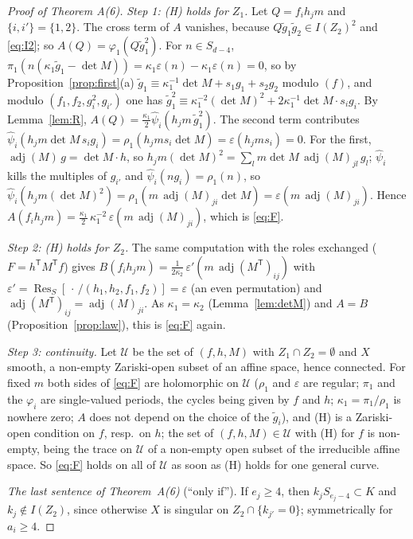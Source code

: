 \documentclass[11pt]{article}
\numberwithin{equation}{section}
\theoremstyle{remark}
\newcommand{\Res}{\operatorname{Res}}
\newcommand{\adj}{\operatorname{adj}}
\newcommand{\gt}{\tilde g}
\begin{document}
\begin{proof}[Proof of Theorem A(6)]
\emph{Step 1: \textup{(H)} holds for $Z_1$.} Let $Q=f_ih_jm$ and $\{i,i'\}=\{1,2\}$. The cross term of $A$
vanishes, because $Q\gt_1\gt_2\in I(Z_2)^2$ and \eqref{eq:I2}; so $A(Q)=\varphi_1(Q\gt_1^2)$. For $n\in S_{d-4}$,
$\pi_1(n(\kappa_1\gt_1-\det M))=\kappa_1\varepsilon(n)-\kappa_1\varepsilon(n)=0$, so by
Proposition~\ref{prop:first}(a) $\gt_1\equiv\kappa_1^{-1}\det M+s_1g_1+s_2g_2$ modulo $(f)$, and modulo
$(f_1,f_2,g_i^2,g_{i'})$ one has $\gt_1^2\equiv\kappa_1^{-2}(\det M)^2+2\kappa_1^{-1}\det M\cdot s_ig_i$. By
Lemma~\ref{lem:R}, $A(Q)=\frac{\kappa_1}2\hat\psi_i(h_jm\,\gt_1^2)$. The second term contributes
$\hat\psi_i(h_jm\det M\,s_ig_i)=\rho_1(h_jms_i\det M)=\varepsilon(h_jms_i)=0$. For the first,
$\adj(M)\,g=\det M\cdot h$, so $h_jm(\det M)^2=\sum_{l}m\det M\,\adj(M)_{jl}\,g_{l}$; $\hat\psi_i$ kills the
multiples of $g_{i'}$ and $\hat\psi_i(ng_i)=\rho_1(n)$, so
$\hat\psi_i(h_jm(\det M)^2)=\rho_1(m\,\adj(M)_{ji}\det M)=\varepsilon(m\,\adj(M)_{ji})$. Hence
$A(f_ih_jm)=\frac{\kappa_1}2\,\kappa_1^{-2}\,\varepsilon(m\,\adj(M)_{ji})$, which is \eqref{eq:F}.

\emph{Step 2: \textup{(H)} holds for $Z_2$.} The same computation with the roles exchanged
($F=h^{\mathsf T}M^{\mathsf T}f$) gives $B(f_ih_jm)=\frac1{2\kappa_2}\,\varepsilon'(m\,\adj(M^{\mathsf T})_{ij})$
with $\varepsilon'=\Res_S[\,\cdot\,/(h_1,h_2,f_1,f_2)]=\varepsilon$ (an even permutation) and
$\adj(M^{\mathsf T})_{ij}=\adj(M)_{ji}$. As $\kappa_1=\kappa_2$ (Lemma~\ref{lem:detM}) and $A=B$
(Proposition~\ref{prop:law}), this is \eqref{eq:F} again.

\emph{Step 3: continuity.} Let $\mathcal U$ be the set of $(f,h,M)$ with $Z_1\cap Z_2=\emptyset$ and $X$ smooth,
a non-empty Zariski-open subset of an affine space, hence connected. For fixed $m$ both sides of \eqref{eq:F}
are holomorphic on $\mathcal U$ ($\rho_1$ and $\varepsilon$ are regular; $\pi_1$ and the $\varphi_i$ are
single-valued periods, the cycles being given by $f$ and $h$; $\kappa_1=\pi_1/\rho_1$ is nowhere zero; $A$ does
not depend on the choice of the $\gt_i$), and (H) is a Zariski-open condition on $f$, resp.\ on $h$; the set of $(f,h,M)\in\mathcal U$ with
(H) for $f$ is non-empty, being the trace on $\mathcal U$ of a non-empty open subset of the irreducible affine
space. So
\eqref{eq:F} holds on all of $\mathcal U$ as soon as (H) holds for one general curve.

\emph{The last sentence of Theorem~\textup{A(6)}} (``only if''). If $e_j\ge4$, then $k_jS_{e_j-4}\subset K$ and
$k_j\notin I(Z_2)$, since otherwise $X$ is singular on $Z_2\cap\{k_{j'}=0\}$; symmetrically for $a_i\ge4$.
\end{proof}
\end{document}
